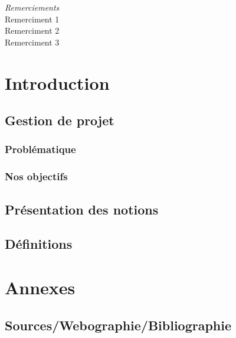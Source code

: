 \documentclass[a4paper,12pt,one side,titlepage]{report}
\begin{document}




\emph{\Large Remerciements}
\\[2cm]
Remerciment 1
\\[1cm]
Remerciment 2
\\[2cm]
Remerciment 3


\setcounter{tocdepth}{1}
\tableofcontents

\part{Introduction}
\chapter{Gestion de projet}
\section{Problématique}
\lipsum
\section{Nos objectifs}
\chapter{Présentation des notions}
\chapter{Définitions}
\part{Annexes}
\chapter{Sources/Webographie/Bibliographie}



\end{document}
